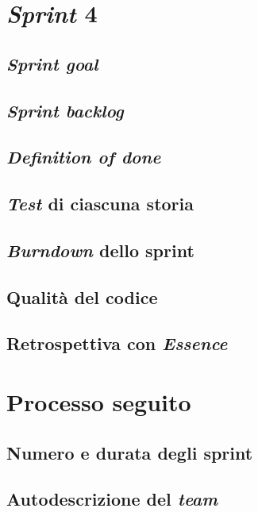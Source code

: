\documentclass{article}
\begin{document}
\section{\emph{Sprint} 4}

\subsection{\emph{Sprint goal}}

\subsection{\emph{Sprint backlog}}

\subsection{\emph{Definition of done}}

\subsection{\emph{Test} di ciascuna storia}

\subsection{\emph{Burndown} dello sprint}

\subsection{Qualità del codice}

\subsection{Retrospettiva con \emph{Essence}}

\section{Processo seguito}

\subsection{Numero e durata degli sprint}

\subsection{Autodescrizione del \emph{team}}
\end{document}

